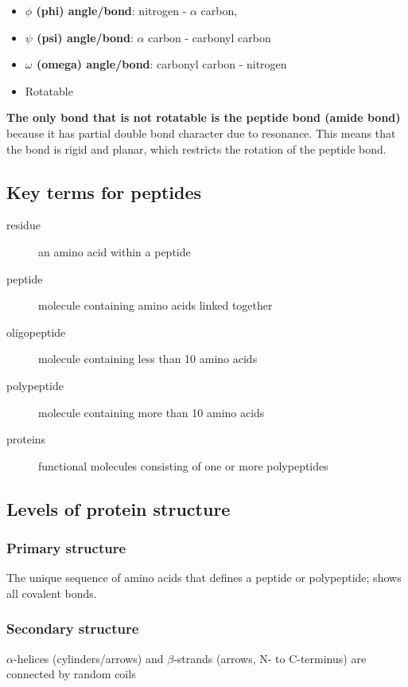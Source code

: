 \documentclass[letterpaper, 12pt]{article}
\begin{document}
\begin{itemize}
\item \textbf{$\phi$ (phi) angle/bond}: nitrogen - $\alpha$ carbon, 
\item \textbf{$\psi$ (psi) angle/bond}: $\alpha$ carbon - carbonyl carbon 
\item \textbf{$\omega$ (omega) angle/bond}: carbonyl carbon - nitrogen 
\item Rotatable
\end{itemize}

\textbf{The only bond that is not rotatable is the peptide bond (amide bond)} because it has partial double bond character due to resonance. This means that the  bond is rigid and planar, which restricts the rotation of the peptide bond.

\subsection*{Key terms for peptides}

\begin{description}
\item [residue] an amino acid within a peptide
\item [peptide] molecule containing amino acids linked together
\item [oligopeptide] molecule containing less than 10 amino acids
\item [polypeptide] molecule containing more than 10 amino acids
\item [proteins] functional molecules consisting of one or more polypeptides
\end{description}

\subsection*{Levels of protein structure}

\subsubsection*{Primary structure}
The unique sequence of amino acids that defines a peptide or polypeptide; shows all covalent bonds.

\subsubsection*{Secondary structure}
$\alpha$-helices (cylinders/arrows) and $\beta$-strands (arrows, N- to C-terminus) are connected by random coils
\end{document}
